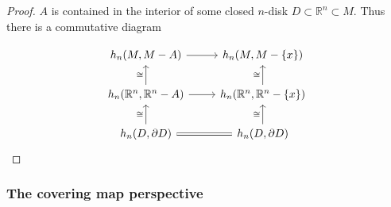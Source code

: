 \documentclass[reqno]{amsart}
\theoremstyle{definition}
\theoremstyle{remark}
\begin{document}
\begin{proof}
    $A$ is contained in the interior of some
    closed $n$-disk $D \subset \mathbb{R}^{n} \subset M$.
    Thus there is a commutative diagram

    \begin{equation*}
    \begin{tikzcd}
        h_n(M, M-A) \ar[r] & h_n(M, M- \left\{ x \right\} )\\
        h_n(\mathbb{R}^{n}, \mathbb{R}^{n} - A) 
        \ar[u, "\cong"] \ar[r] & 
        h_n(\mathbb{R}^{n}, \mathbb{R}^{n} - \left\{ x \right\} )
        \ar[u, "\cong"] \\
        h_n(D, \partial D) 
        \ar[u, "\cong"] \ar[r, equal] &
        h_n(D, \partial D) \ar[u, "\cong"]
    \end{tikzcd}
    \end{equation*}
\end{proof}




\subsubsection{The covering map perspective}
\end{document}
